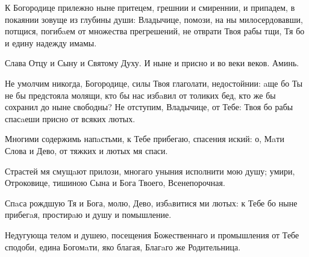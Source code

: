 \mychapterending


\begin{mymulticols}





К Богородице прилежно ныне притецем, грешнии и смиреннии, и припадем, в покаянии зовуще из глубины души: Владычице, помози, на ны милосердовавши, потщися, погибaем от множества прегрешений, не отврати Твоя рабы тщи, Тя бо и едину надежду имамы. 

Слава Отцу и Сыну и Святому Духу. И ныне и присно и во веки веков. Аминь.

Не умолчим никогда, Богородице, силы Твоя глаголати, недостойнии: aще бо Ты не бы предстояла молящи, кто бы нас избaвил от толиких бед, кто же бы сохранил до ныне свободны? Не отступим, Владычице, от Тебе: Твоя бо рабы спасaеши присно от всяких лютых.


\PsalmFifty





Многими содержимь напaстьми, к Тебе прибегаю, спасения иский: о, Мaти Слова и Дево, от тяжких и лютых мя спаси.


Страстей мя смущaют прилози, многаго уныния исполнити мою душу; умири, Отроковице, тишиною Сына и Бога Твоего, Всенепорочная.

\slava

Спaса рождшую Тя и Бога, молю, Дево, избaвитися ми лютых: к Тебе бо ныне прибегaя, простирaю и душу и помышление.

\inyne

Недугующа телом и душею, посещения Божественнаго и промышления от Тебе сподоби, едина Богомaти, яко благая, Благaго же Родительница.


\end{mymulticols}
